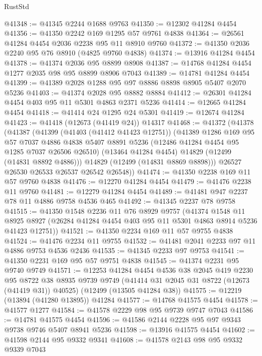 \begin{lexlean}{RustStd}
\begin{coremodule}
{\begin{coremodule}
{{{{{{{{{{{{{{{{{{{{{{{{{{{{{{{{{{{{{{{{{{{{{{{{{{{{{{{{{{{{{{{{{{{{{{{{{{{{{{{{@41348 := @41345 @2244 @1688 @9763
@41350 := @12302 @41284 @4454
@41356 := @41350 @2242 @169 @1295 @57 @9761 @4838
@41364 := @26561 @41284 @4454 @2036 @2238 @95 @11 @8910 @9760
@41372 := @41350 @2036 @2240 @95 @76 @8910 (@4825 @9760 @4838)
@41374 := @13916 @41284 @4454
@41378 := @41374 @2036 @95 @8899 @8908
@41387 := @14768 @41284 @4454 @1277 @2035 @98 @95 @8899 @8906 @7043
@41389 := @14781 @41284 @4454
@41399 := @41389 @2028 @1288 @95 @97 @8886 @8898 @8905 @5407 @2070 @5236
@41403 := @41374 @2028 @95 @8882 @8884
@41412 := @26301 @41284 @4454 @403 @95 @11 @5301 @4863 @2371 @5236
@41414 := @12665 @41284 @4454
@41418 := @41414 @24 @1295 @24 @5301
@41419 := @12674 @41284
@41423 := @41418 (@12673 (@41419 @24)) @14317
@41468 := @41372
    (@41378
      (@41387
        (@41399
          (@41403 (@41412 @41423 @12751))
          (@41389
            @1286
            @169
            @95
            @57
            @7037
            @4886
            @4838
            @5407
            @8891
            @5236
            (@12486 @41284 @4454 @95 @1285 @7037 @26506 @26510)
            (@13464 @41284 @4454)
            @14829
            (@12499 (@14831 @8892 @4886)))
          @14829
          (@12499 (@14831 @8869 @8898)))
        @26527
        @26530
        @26533
        @26537
        @26542
        @26548))
@41474 := @41350 @2238 @169 @11 @57 @9760 @4838
@41476 := @12270 @41284 @4454
@41479 := @41476 @2238 @11 @9760
@41481 := @12279 @41284 @4454
@41489 := @41481 @947 @2237 @78 @11 @4886 @9758 @4536 @465
@41492 := @41345 @2237 @78 @9758
@41515 := @41350
    @1548
    @2236
    @11
    @76
    @8929
    @9757
    (@41374
      @1548
      @11
      @8925
      @8927
      (@26284 @41284 @4454 @403 @95 @11 @5301 @4863 @8914 @5236 @41423 @12751))
@41521 := @41350 @2234 @169 @11 @57 @9755 @4838
@41524 := @41476 @2234 @11 @9755
@41532 := @41481 @2041 @2233 @97 @11 @4886 @9753 @4536 @2436
@41535 := @41345 @2233 @97 @9753
@41541 := @41350 @2231 @169 @95 @57 @9751 @4838
@41545 := @41374 @2231 @95 @9740 @9749
@41571 := @12253
    @41284
    @4454
    @4536
    @38
    @2045
    @419
    @2230
    @95
    @8722
    @38
    @8935
    @9739
    @9749
    (@41414 @31 @2045 @31 @8722 (@12673 (@41419 @31)) @40525)
    (@12499 (@13505 @41284 @38))
@41575 := @12219 (@13894 (@41280 @13895)) @41284
@41577 := @14768 @41575 @4454
@41578 := @41577 @1277
@41584 := @41578 @2229 @98 @95 @9739 @9747 @7043
@41586 := @14781 @41575 @4454
@41596 := @41586 @2144 @2228 @95 @97 @9343 @9738 @9746 @5407 @8941 @5236
@41598 := @13916 @41575 @4454
@41602 := @41598 @2144 @95 @9332 @9341
@41608 := @41578 @2143 @98 @95 @9332 @9339 @7043
}}}}}}}}}}}}}}}}}}}}}}}}}}}}}}}}}}}}}}}}}}}}}}}}}}}}}}}}}}}}}}}}}}}}}}}}}}}}}}}}
\end{coremodule}}
\end{coremodule}
\end{lexlean}
